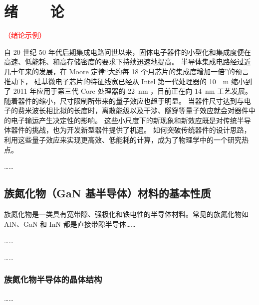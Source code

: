 
\chapter[绪~~~~论]{绪~~~~论}
{\textcolor{red}{（绪论示例）}}

自 20 世纪 50 年代后期集成电路问世以来，固体电子器件的小型化和集成度便在高速、低能耗、和高存储密度的要求下持续迅速地提高。
半导体集成电路经过近几十年来的发展，在 Moore 定律“大约每 18 个月芯片的集成度增加一倍”的预言推动下，
硅基微电子芯片的特征线宽已经从 Intel 第一代处理器的 \SI{10}{\mu m} 缩小到了 2011 年应用于第三代 Core 处理器的 \SI{22}{nm} \cite{Reference_authors_Chinese,Reference_translated_Chinese}，目前正在向 \SI{14}{nm} 工艺发展。
随着器件的缩小，尺寸限制所带来的量子效应也趋于明显。
当器件尺寸达到与电子的费米波长相比拟的长度时，离散能级以及干涉、隧穿等量子效应就会对器件中的电子输运产生决定性的影响。
这些小尺度下的新现象和新效应既是对传统半导体器件的挑战，也为开发新型器件提供了机遇。
如何突破传统器件的设计思路，利用这些量子效应来实现更高效、低能耗的计算，成为了物理学中的一个研究热点\cite{Reference_book,Reference_article,Reference_techreport,Reference_thesis}。

……

\section{\expandafter{}族氮化物（GaN 基半导体）材料的基本性质}
族氮化物是一类具有宽带隙、强极化和铁电性的半导体材料。常见的族氮化物如 AlN、GaN 和 InN 都是直接带隙半导体……

……

……

\subsection{\expandafter{}族氮化物半导体的晶体结构}
……
